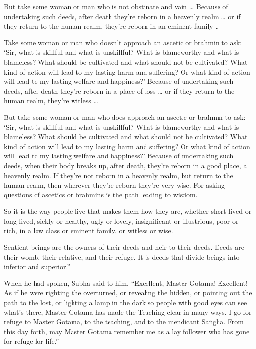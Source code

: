 \documentclass[12pt,openany]{book}%
\begin{document}
But take some woman or man who is not obstinate and vain … Because of undertaking such deeds, after death they’re reborn in a heavenly realm … or if they return to the human realm, they’re reborn in an eminent family … 

Take some woman or man who doesn’t approach an ascetic or brahmin to ask: ‘Sir, what is skillful and what is unskillful? What is blameworthy and what is blameless? What should be cultivated and what should not be cultivated? What kind of action will lead to my lasting harm and suffering? Or what kind of action will lead to my lasting welfare and happiness?’ Because of undertaking such deeds, after death they’re reborn in a place of loss … or if they return to the human realm, they’re witless … 

But take some woman or man who does approach an ascetic or brahmin to ask: ‘Sir, what is skillful and what is unskillful? What is blameworthy and what is blameless? What should be cultivated and what should not be cultivated? What kind of action will lead to my lasting harm and suffering? Or what kind of action will lead to my lasting welfare and happiness?’ Because of undertaking such deeds, when their body breaks up, after death, they’re reborn in a good place, a heavenly realm. If they’re not reborn in a heavenly realm, but return to the human realm, then wherever they’re reborn they’re very wise. For asking questions of ascetics or brahmins is the path leading to wisdom. 

So it is the way people live that makes them how they are, whether short-lived or long-lived, sickly or healthy, ugly or lovely, insignificant or illustrious, poor or rich, in a low class or eminent family, or witless or wise. 

Sentient beings are the owners of their deeds and heir to their deeds. Deeds are their womb, their relative, and their refuge. It is deeds that divide beings into inferior and superior.” 

When he had spoken, Subha said to him, “Excellent, Master Gotama! Excellent! As if he were righting the overturned, or revealing the hidden, or pointing out the path to the lost, or lighting a lamp in the dark so people with good eyes can see what’s there, Master Gotama has made the Teaching clear in many ways. I go for refuge to Master Gotama, to the teaching, and to the mendicant \textsanskrit{Saṅgha}. From this day forth, may Master Gotama remember me as a lay follower who has gone for refuge for life.” 
\end{document}
